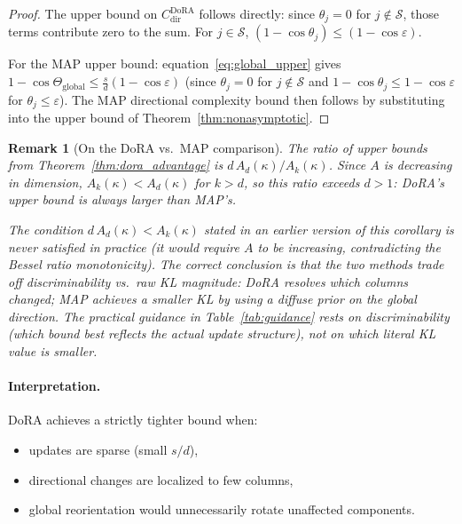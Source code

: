 \documentclass[11pt]{article}
\newtheorem{remark}[theorem]{Remark}
\newcommand{\Ad}{A_d}
\newcommand{\Ak}{A_k}
\begin{document}
\begin{proof}
The upper bound on $C^{\mathrm{DoRA}}_{\mathrm{dir}}$ follows directly: since
$\theta_j = 0$ for $j \notin \mathcal{S}$, those terms contribute zero to
the sum.  For $j \in \mathcal{S}$, $(1-\cos\theta_j) \leq (1-\cos\varepsilon)$.

For the MAP upper bound: equation~\eqref{eq:global_upper} gives
$1 - \cos\Theta_{\mathrm{global}} \leq \tfrac{s}{d}(1-\cos\varepsilon)$
(since $\theta_j = 0$ for $j \notin \mathcal{S}$ and $1-\cos\theta_j \leq 1-\cos\varepsilon$
for $\theta_j \leq \varepsilon$).
The MAP directional complexity bound then follows by substituting into the
upper bound of Theorem~\ref{thm:nonasymptotic}.
\end{proof}

\begin{remark}[On the DoRA vs.\ MAP comparison]
\label{rem:comparison}
The ratio of upper bounds from Theorem~\ref{thm:dora_advantage} is
$d\,\Ad(\kappa)/\Ak(\kappa)$.
Since $A$ is \emph{decreasing} in dimension, $\Ak(\kappa) < \Ad(\kappa)$ for
$k > d$, so this ratio exceeds $d > 1$: DoRA's upper bound is always larger
than MAP's.

The condition $d\,\Ad(\kappa) < \Ak(\kappa)$ stated in an earlier version of
this corollary is \emph{never satisfied} in practice (it would require $A$ to
be increasing, contradicting the Bessel ratio monotonicity).
The correct conclusion is that the two methods trade off \emph{discriminability}
vs.\ \emph{raw KL magnitude}: DoRA resolves which columns changed;
MAP achieves a smaller KL by using a diffuse prior on the global direction.
The practical guidance in Table~\ref{tab:guidance} rests on discriminability
(which bound best reflects the actual update structure), not on which
literal KL value is smaller.
\end{remark}

\paragraph{Interpretation.}
DoRA achieves a strictly tighter bound when:
\begin{itemize}
  \item updates are sparse (small $s/d$),
  \item directional changes are localized to few columns,
  \item global reorientation would unnecessarily rotate unaffected components.
\end{itemize}
\end{document}
